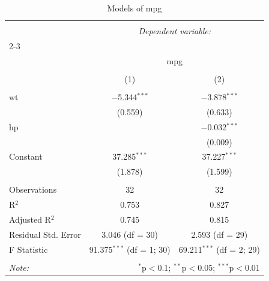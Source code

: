 
\begin{table}[!htbp] \centering
  \caption{Models of mpg}
  \label{tab:mpg}
\begin{tabular}{@{\extracolsep{5pt}}lcc}
\\[-1.8ex]\hline
\hline \\[-1.8ex]
 & \multicolumn{2}{c}{\textit{Dependent variable:}} \\
\cline{2-3}
\\[-1.8ex] & \multicolumn{2}{c}{mpg} \\
\\[-1.8ex] & (1) & (2)\\
\hline \\[-1.8ex]
 wt & $-$5.344$^{***}$ & $-$3.878$^{***}$ \\
  & (0.559) & (0.633) \\
  hp &  & $-$0.032$^{***}$ \\
  &  & (0.009) \\
  Constant & 37.285$^{***}$ & 37.227$^{***}$ \\
  & (1.878) & (1.599) \\
 \hline \\[-1.8ex]
Observations & 32 & 32 \\
R$^{2}$ & 0.753 & 0.827 \\
Adjusted R$^{2}$ & 0.745 & 0.815 \\
Residual Std. Error & 3.046 (df = 30) & 2.593 (df = 29) \\
F Statistic & 91.375$^{***}$ (df = 1; 30) & 69.211$^{***}$ (df = 2; 29) \\
\hline
\hline \\[-1.8ex]
\textit{Note:}  & \multicolumn{2}{r}{$^{*}$p$<$0.1; $^{**}$p$<$0.05; $^{***}$p$<$0.01} \\
\end{tabular}
\end{table}
